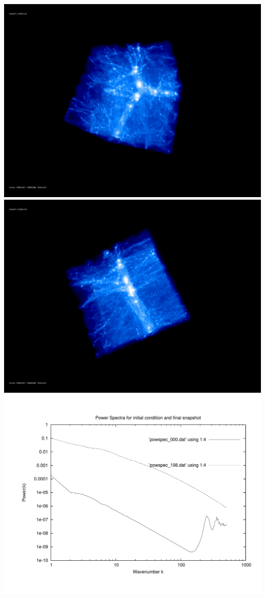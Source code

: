 \includegraphics[scale=0.1]{stages_50/rotate_00074.jpg} 
\includegraphics[scale=0.1]{stages_50/rotate_00131.jpg}  \\

\includegraphics[scale=0.5]{stages_50/plot_powspec_stages_50}

